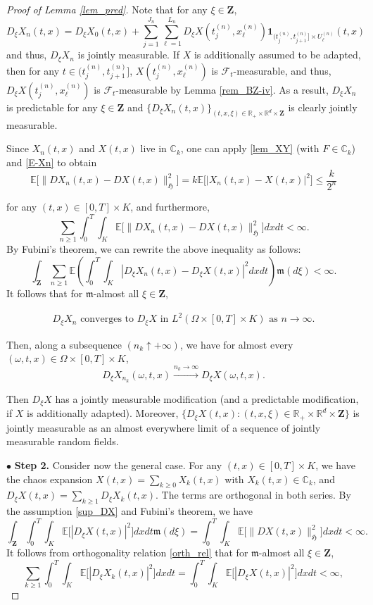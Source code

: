 \documentclass[letterpaper, 11pt,  reqno]{amsart}
\newcommand{\noi}{\noindent}
\newcommand{\R}{\mathbb{R}}
\newcommand{\bul}{\bullet}
\newcommand{\E}{\mathbb{E}}
\newcommand{\F}{\mathcal{F}}
\renewcommand{\o}{\omega}
\newcommand{\ind}{\mathbf 1}
\newcommand{\fm}{\mathfrak{m}}
\newcommand{\fH}{\mathfrak{H}}
\numberwithin{equation}{section}
\numberwithin{theorem}{section}
\begin{document}
\begin{proof}[Proof of Lemma \ref{lem_pred}]
 Note that for any $\xi \in \mathbf{Z}$,
\[
D_{\xi}X_n(t,x)= D_\xi X_0(t,x) + 
\sum_{j=1}^{J_n}\sum_{\ell=1}^{L_n}D_{\xi}X(t_j^{(n)},x_{\ell}^{(n)}) 
\ind_{(t_{j}^{(n)},t_{j+1}^{(n)}] \times U_{\ell}^{(n)}}(t,x) 
\]
and thus,
 $D_{\xi}X_n$ is jointly measurable. 
 If  $X$ is additionally assumed to be  adapted, 
 then for any $t \in (t_j^{(n)},t_{j+1}^{(n)}]$,  
 $X(t_j^{(n)},x_{\ell}^{(n)})$ is $\F_t$-measurable, and thus, 
 $D_{\xi}X(t_j^{(n)},x_{\ell}^{(n)})$ is   $\F_t$-measurable 
 by Lemma \ref{rem_BZ-iv}.
 As a result,   $D_{\xi}X_n$ is predictable for any $\xi \in \mathbf{Z}$
and
 $\{D_\xi X_n(t,x)\}_{(t, x, \xi)\in \R_+\times\R^d\times\mathbf{Z}}$
is clearly  jointly measurable. 

 
 
 

Since $X_n(t,x)$ and  $X(t,x)$ live in  $\mathbb{C}_k$,  
one can apply  \eqref{lem_XY} (with $F\in\mathbb{C}_k$)     
and \eqref{E-Xn} to obtain 
\[
\E\big[\|DX_n(t,x)-DX(t,x) \|_{\fH}^2\big]=k \E\big[|X_n(t,x)-X(t,x)|^2\big]\leq \frac{k}{2^n}
\]


\noi
for any $(t, x)\in [0, T]\times K$,
and furthermore, 
\[
\sum_{n\geq 1}\int_0^T \int_{K}\E\big[\|DX_n(t,x)-DX(t,x) \|_{\fH}^2\big]dxdt <\infty.
\]
By Fubini's theorem, we can rewrite the above inequality as follows:
\[
\int_{\mathbf{Z}}\sum_{n\geq 1}
\E\left(\int_0^T \int_{K} |D_{\xi}X_n(t,x)-D_{\xi}X(t,x)|^2dxdt \right) \fm(d\xi)
<\infty. 
\]
It follows that for $\fm$-almost all $\xi \in \mathbf{Z}$,

\noi
\begin{align*} 
\text{$D_{\xi}X_n$ converges to   $D_{\xi}X$ 
in $L^2(\Omega \times [0,T]\times K)$ as $n\to \infty$}. 
\end{align*}

\noi
Then, along a subsequence $(n_k\uparrow +\infty)$,
 we have for almost every $(\omega,t,x) \in \Omega \times [0,T]\times K$,
\[
D_{\xi}X_{n_k}(\o,t,x) \xrightarrow{n_k\to\infty} D_{\xi}X(\o,t,x).
\]
 
\noi
Then $D_{\xi}X$ has a jointly measurable modification 
(and a predictable modification, if $X$ is additionally  adapted). 
Moreover, 
$\{D_\xi X(t,x): (t, x, \xi)\in \R_+\times\R^d\times\mathbf{Z}\}$
is jointly measurable
as an almost everywhere limit 
of a sequence of jointly measurable random fields. 

\smallskip

$\bul$  {\bf Step 2.}   Consider now the general case. 
For any $(t,x)\in [0,T]\times K$, we have the chaos expansion 
$X(t,x)=\sum_{k\geq 0}X_k(t,x)$ with $X_k(t,x)\in \mathbb{C}_k$, and
$D_{\xi}X(t,x)=\sum_{k\geq 1}D_{\xi}X_k(t,x)$. 
The terms are orthogonal in both series. 
By  the assumption \eqref{sup_DX} and Fubini's theorem,
we have 
\[
\int_{\mathbf{Z}} \int_0^T \int_{K} 
\E\big[|D_{\xi}X(t,x)|^2\big] dxdt\fm(d\xi)=
\int_0^T \int_{K} 
\E\big[\|DX(t,x)\|_{\fH}^2\big] dxdt<\infty.
\]
It follows from orthogonality  relation \eqref{orth_rel}  that 
for $\fm$-almost all $\xi \in \mathbf{Z}$, 
\[
\sum_{k\geq 1}
\int_0^T \int_{K} 
\E\big[|D_{\xi}X_k(t,x)|^2\big] dxdt=\int_0^T \int_{K} 
\E\big[|D_{\xi}X(t,x)|^2\big] dxdt<\infty,
\]
 

\end{proof}
\end{document}

